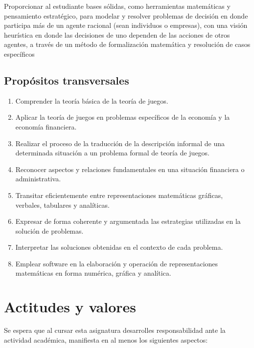 \documentclass[11pt]{article}
\begin{document}
Proporcionar al estudiante bases sólidas, como herramientas matemáticas y pensamiento estratégico, para modelar y resolver problemas de decisión en donde participa más de un agente racional (sean individuos o empresas), con una visión heurística en donde las decisiones de uno dependen de las acciones de otros agentes, a través de un método de formalización matemática y resolución de casos específicos


\subsection{Propósitos transversales}

\begin{tcolorbox}[colback=yelltcol!80]
	\begin{enumerate}[\thesubsection .1]
		\setlength{\itemsep}{0pt}
		\item Comprender la teoría básica de la teoría de juegos.
		\item Aplicar la teoría de juegos en problemas específicos de la economía y la economía financiera.
		\item Realizar el proceso de la traducción de la descripción informal de una determinada situación a un problema formal de teoría de juegos.
		\item Reconocer aspectos y relaciones fundamentales en una situación financiera o administrativa.
		\item Transitar eficientemente entre representaciones matemáticas gráficas, verbales, tabulares y analíticas.
		\item Expresar de forma coherente y argumentada las estrategias utilizadas en la solución de problemas.
		\item Interpretar las soluciones obtenidas en el contexto de cada problema.
		\item Emplear software en la elaboración y operación de representaciones matemáticas en forma numérica, gráfica y analítica.
	\end{enumerate}
\end{tcolorbox}

\section{Actitudes y valores}

Se espera que al cursar esta asignatura desarrolles responsabilidad ante la actividad académica, manifiesta en al menos los siguientes aspectos:
\end{document}
